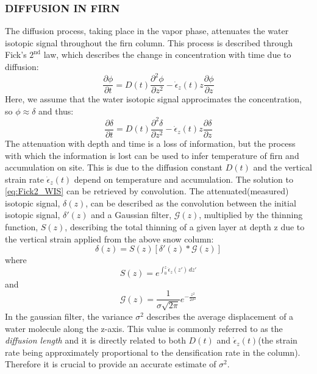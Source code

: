 \documentclass[11pt]{article}
\begin{document}
\subsubsection{DIFFUSION IN FIRN}
The diffusion process, taking place in the vapor phase, attenuates the water isotopic signal throughout the firn column. This process is described through Fick's $2^{\text{nd}}$ law, which describes the change in concentration with time due to diffusion:
\begin{equation}
	\frac{\partial \phi}{\partial t} = D(t) \frac{\partial^2 \phi}{\partial z^2} - \dot{\epsilon}_z(t) z \frac{\partial \phi}{\partial z}
	\label{eq:Fick2_concentration}
\end{equation}
Here, we assume that the water isotopic signal approcimates the concentration, so $\phi \approx \delta$ and thus:
\begin{equation}
	\frac{\partial \delta}{\partial t} = D(t) \frac{\partial^2 \delta}{\partial z^2} - \dot{\epsilon}_z(t) z \frac{\partial \delta}{\partial z}
	\label{eq:Fick2_WIS}
\end{equation}
The attenuation with depth and time is a loss of information, but the process with which the information is lost can be used to infer temperature of firn and accumulation on site. This is due to the diffusion constant $D(t)$ and the vertical strain rate $\dot{\epsilon}_z(t)$ depend on temperature and accumulation.
The solution to \ref{eq:Fick2_WIS} can be retrieved by convolution. The attenuated(measured) isotopic signal, $\delta(z)$, can be described as the convolution between the initial isotopic signal, $\delta'(z)$ and a Gaussian filter, $\mathcal{G}(z)$, multiplied by the thinning function, $S(z)$, describing the total thinning of a given layer at depth z due to the vertical strain applied from the above snow column:
\begin{equation}
	\delta(z) = S(z)[\delta'(z)*\mathcal{G}(z)]
	\label{eq:diff_solution_conv}
\end{equation}
where
\begin{equation}
	S(z) = e^{\int_{0}^{z}\dot{\epsilon}_z(z')\, dz'}
	\label{eq:Thinning_fct}
\end{equation}
and
\begin{equation}
	\mathcal{G}(z) = \frac{1}{\sigma\sqrt{2\pi}}e^{-\frac{z^2}{2\sigma^2}}
	\label{eq:Gauss_filter}
\end{equation}
In the gaussian filter, the variance $\sigma^2$ describes the average displacement of a water molecule along the z-axis. This value is commonly referred to as the \textit{diffusion length} and it is directly related to both $D(t)$ and $\dot{\epsilon}_z(t)$(the strain rate being approximately proportional to the densification rate in the column). Therefore it is crucial to provide an accurate estimate of $\sigma^2$.
\end{document}
